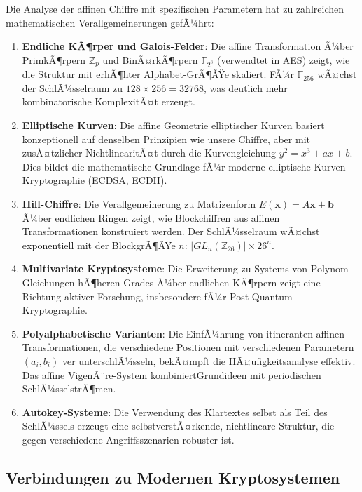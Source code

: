﻿\documentclass[12pt,a4paper]{article}
\begin{document}
	Die Analyse der affinen Chiffre mit spezifischen Parametern hat zu zahlreichen mathematischen Verallgemeinerungen gefÃ¼hrt:
	
	\begin{enumerate}
		\item \textbf{Endliche KÃ¶rper und Galois-Felder}: Die affine Transformation Ã¼ber PrimkÃ¶rpern $\mathbb{Z}_p$ und BinÃ¤rkÃ¶rpern $\mathbb{F}_{2^8}$ (verwendtet in AES) zeigt, wie die Struktur mit erhÃ¶hter Alphabet-GrÃ¶ÃŸe skaliert. FÃ¼r $\mathbb{F}_{256}$ wÃ¤chst der SchlÃ¼sselraum zu $128 \times 256 = 32768$, was deutlich mehr kombinatorische KomplexitÃ¤t erzeugt.
		
		\item \textbf{Elliptische Kurven}: Die affine Geometrie elliptischer Kurven basiert konzeptionell auf denselben Prinzipien wie unsere Chiffre, aber mit zusÃ¤tzlicher NichtlinearitÃ¤t durch die Kurvengleichung $y^2 = x^3 + ax + b$. Dies bildet die mathematische Grundlage fÃ¼r moderne elliptische-Kurven-Kryptographie (ECDSA, ECDH).
		
		\item \textbf{Hill-Chiffre}: Die Verallgemeinerung zu Matrizenform $E(\mathbf{x}) = A\mathbf{x} + \mathbf{b}$ Ã¼ber endlichen Ringen zeigt, wie Blockchiffren aus affinen Transformationen konstruiert werden. Der SchlÃ¼sselraum wÃ¤chst exponentiell mit der BlockgrÃ¶ÃŸe $n$: $|GL_n(\mathbb{Z}_{26})| \times 26^n$.
		
		\item \textbf{Multivariate Kryptosysteme}: Die Erweiterung zu Systems von Polynom-Gleichun\-gen hÃ¶heren Grades Ã¼ber endlichen KÃ¶rpern zeigt eine Richtung aktiver Forschung, insbesondere fÃ¼r Post-Quantum-Kryptographie.
		
		\item \textbf{Polyalphabetische Varianten}: Die EinfÃ¼hrung von itineranten affinen Transformationen, die verschiedene Positionen mit verschiedenen Parametern $(a_i, b_i)$ ver unterschlÃ¼sseln, bekÃ¤mpft die HÃ¤ufigkeitsanalyse effektiv. Das affine VigenÃ¨re-System kombiniertGrundideen mit periodischen SchlÃ¼sselstrÃ¶men.
		
		\item \textbf{Autokey-Systeme}: Die Verwendung des Klartextes selbst als Teil des SchlÃ¼ssels erzeugt eine selbstverstÃ¤rkende, nichtlineare Struktur, die gegen verschiedene Angriffsszenarien robuster ist.
	\end{enumerate}
	
	\subsection{Verbindungen zu Modernen Kryptosystemen}
	
\end{document}

